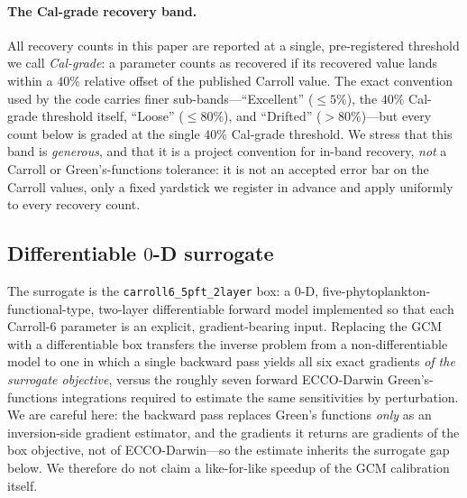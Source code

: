\documentclass[11pt]{article}
\begin{document}
\paragraph{The Cal-grade recovery band.}
All recovery counts in this paper are reported at a single, pre-registered threshold we call \emph{Cal-grade}: a parameter counts as recovered if its recovered value lands within a $40\%$ relative offset of the published Carroll value. The exact convention used by the code carries finer sub-bands---``Excellent'' ($\le5\%$), the $40\%$ Cal-grade threshold itself, ``Loose'' ($\le80\%$), and ``Drifted'' ($>80\%$)---but every count below is graded at the single $40\%$ Cal-grade threshold. We stress that this band is \emph{generous}, and that it is a project convention for in-band recovery, \emph{not} a Carroll or Green's-functions tolerance: it is not an accepted error bar on the Carroll values, only a fixed yardstick we register in advance and apply uniformly to every recovery count.

\subsection{Differentiable $0$-D surrogate}

The surrogate is the \texttt{carroll6\_5pft\_2layer} box: a $0$-D, five-phytoplankton-functional-type, two-layer differentiable forward model implemented so that each Carroll-6 parameter is an explicit, gradient-bearing input. Replacing the GCM with a differentiable box transfers the inverse problem from a non-differentiable model to one in which a single backward pass yields all six exact gradients \emph{of the surrogate objective}, versus the roughly seven forward ECCO-Darwin Green's-functions integrations required to estimate the same sensitivities by perturbation. We are careful here: the backward pass replaces Green's functions \emph{only} as an inversion-side gradient estimator, and the gradients it returns are gradients of the box objective, not of ECCO-Darwin---so the estimate inherits the surrogate gap below. We therefore do not claim a like-for-like speedup of the GCM calibration itself.
\end{document}

